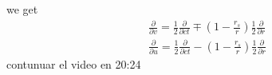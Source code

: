 we get
\begin{equation}
    \begin{array}{l}
        \frac{\partial}{\partial v}=\frac{1}{2} \frac{\partial}{\partial c t} \mp\left(1-\frac{r_s}{r}\right) \frac{1}{2} \frac{\partial}{\partial r} \\
        \frac{\partial}{\partial u}=\frac{1}{2} \frac{\partial}{\partial c t}-\left(1-\frac{r_s}{r}\right) \frac{1}{2} \frac{\partial}{\partial r}
    \end{array}
\end{equation}
contunuar el video en 20:24
